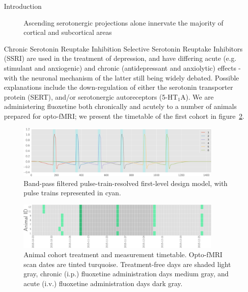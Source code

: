 \documentclass{beamer}
\begin{document}
\begin{frame}
\begin{tudcolumn}{.48\textwidth}
\begin{myblock}{Introduction}
\begin{figure}
\begin{minipage}{0.45\textwidth}
								\caption{Ascending serotonergic projections alone innervate the
								majority of cortical and subcortical areas \cite{Oegren2008}}
							\end{minipage}
						\end{figure}
					\end{myblock}
					\begin{myblock}{Chronic Serotonin Reuptake Inhibition}
						Selective Serotonin Reuptake Inhibitors (SSRI) are used in the
						treatment of depression, and have differing acute (e.g. stimulant
						and anxiogenic) and chronic (antidepressant and anxiolytic)
						effects - with the neuronal mechanism of the latter still being
						widely debated.
						Possible explanations include the down-regulation of either the
						serotonin transporter protein (SERT), and/or serotonergic
						autoreceptors (5-HT$_1$A).
						We are administering fluoxetine both chronically and acutely to a
						number of animals prepared for opto-fMRI; we present the timetable
						of the first cohort in figure~\ref{fig:tt}.
						\vspace{0.5em}
						\begin{figure}
							\begin{minipage}{0.94\textwidth}
								\centering\includegraphics[width=0.9\textwidth]{img/dm.png}
								\caption{Band-pass filtered pulse-train-resolved first-level
										design model, with pulse trains represented in cyan.}
								\label{fig:stim}
							\end{minipage}
						\end{figure}
						\vspace{0.5em}
						\begin{figure}
							\begin{minipage}{0.94\textwidth}
								\centering\includegraphics[width=0.9\textwidth]{img/tt.png}
								\caption{Animal cohort treatment and measurement timetable.
										Opto-fMRI scan dates are tinted turquoise.
										Treatment-free days are shaded light gray, chronic (i.p.)
										fluoxetine administration days medium gray, and acute
										(i.v.) fluoxetine administration days dark gray.}
								\label{fig:tt}
							\end{minipage}
						\end{figure}
						

\end{myblock}
\end{tudcolumn}
\end{frame}
\end{document}
